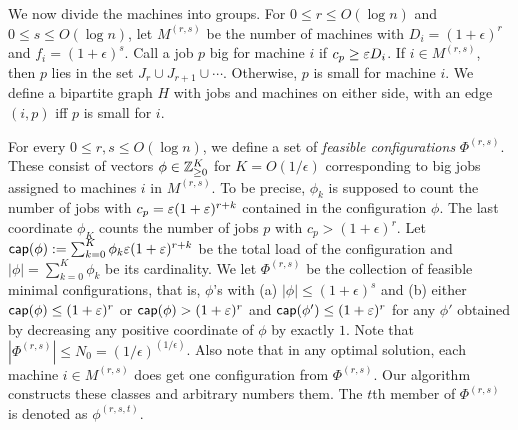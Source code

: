 We now divide the machines into groups. For $0\leq r\leq O(\log n)$ and $0\leq s\leq O(\log n)$, let $M^{(r,s)}$ be the number of machines with $D_i = (1+\epsilon)^r$ and $f_i = (1+\epsilon)^s$.
%
\def\sm{\mathsf{small}}
Call a job $p$  big  for machine $i$ if $c_p \geq \varepsilon D_i$. If $i\in M^{(r,s)}$, then $p$ lies in the set $J_r \cup J_{r+1} \cup \cdots$.
Otherwise, $p$ is small for machine $i$.
We define a bipartite graph $H$ with jobs and machines on either side, with an edge $(i,p)$ iff $p$ is small for $i$.

For every $0\leq r,s \leq O(\log n)$, we define a set of {\em feasible configurations} $\Phi^{(r,s)}$. These consist of vectors $\phi \in {\mathbb Z}^K_{\geq 0}$ for $K=O(1/\epsilon)$ corresponding to big jobs assigned to machines $i$ in $M^{(r,s)}$.
To be precise, $\phi_k$ is supposed to count the number of jobs with $c_p = \varepsilon (1+\varepsilon)^{r+k}$ contained in the configuration $\phi$.
The last coordinate $\phi_K$ counts the number of jobs $p$ with $c_p > (1+\epsilon)^r$.
Let
$\mathsf{cap}(\phi) := \sum_{k=0}^K \phi_k \varepsilon(1+\varepsilon)^{r+k}$ be the total load of the configuration and $|\phi| = \sum_{k=0}^K \phi_k$ be its cardinality.
We let $\Phi^{(r,s)}$ be the collection of feasible minimal configurations, that is, $\phi$'s with (a) $|\phi|\leq (1+\epsilon)^s$ and (b) either $\mathsf{cap}(\phi)\leq (1+\varepsilon)^r$ or $\mathsf{cap}(\phi) > (1+\varepsilon)^r$ and $\mathsf{cap}(\phi') \leq (1+\varepsilon)^r$ for any $\phi'$ obtained by decreasing any positive coordinate of $\phi$ by exactly $1$. Note that $|\Phi^{(r,s)}| \leq N_0 = (1/\epsilon)^{(1/\epsilon)}$. Also note that in any optimal solution, each machine $i\in M^{(r,s)}$ does get one configuration from $\Phi^{(r,s)}$.
Our algorithm constructs these classes and arbitrary numbers them. The $t$th member of $\Phi^{(r,s)}$ is denoted as $\phi^{(r,s,t)}$.%

